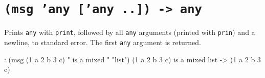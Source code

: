  
\section*{\texttt{(msg 'any ['any ..]) -> any}}
\label{sec:func-ref-M-(msg 'any ['any ..]) -> any}


Prints \texttt{any} with \texttt{print}, followed by all \texttt{any} arguments (printed with
\texttt{prin}) and a newline, to standard error. The first \texttt{any} argument is
returned.


\begin{wideverbatim}
: (msg (1 a 2 b 3 c) " is a mixed " "list")
(1 a 2 b 3 c) is a mixed list
-> (1 a 2 b 3 c)
\end{wideverbatim}


